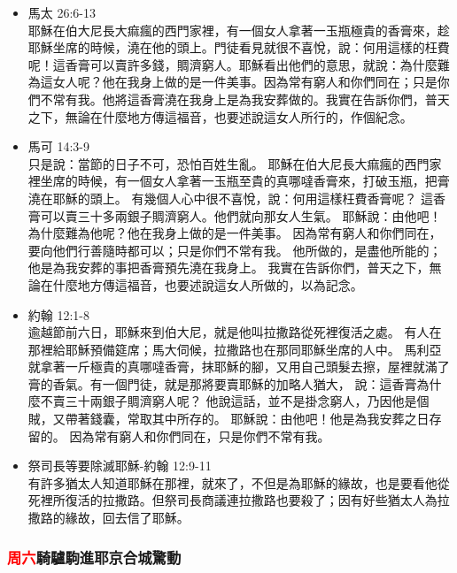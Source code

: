 \begin{itemize}
\item 馬太 26:6-13\\
耶穌在伯大尼長大痲瘋的西門家裡，有一個女人拿著一玉瓶極貴的香膏來，趁耶穌坐席的時候，澆在他的頭上。門徒看見就很不喜悅，說：何用這樣的枉費呢！這香膏可以賣許多錢，賙濟窮人。耶穌看出他們的意思，就說：為什麼難為這女人呢？他在我身上做的是一件美事。因為常有窮人和你們同在；只是你們不常有我。他將這香膏澆在我身上是為我安葬做的。我實在告訴你們，普天之下，無論在什麼地方傳這福音，也要述說這女人所行的，作個紀念。
\item 馬可 14:3-9\\
只是說：當節的日子不可，恐怕百姓生亂。
耶穌在伯大尼長大痲瘋的西門家裡坐席的時候，有一個女人拿著一玉瓶至貴的真哪噠香膏來，打破玉瓶，把膏澆在耶穌的頭上。
有幾個人心中很不喜悅，說：何用這樣枉費香膏呢？
這香膏可以賣三十多兩銀子賙濟窮人。他們就向那女人生氣。
耶穌說：由他吧！為什麼難為他呢？他在我身上做的是一件美事。
因為常有窮人和你們同在，要向他們行善隨時都可以；只是你們不常有我。
他所做的，是盡他所能的；他是為我安葬的事把香膏預先澆在我身上。
我實在告訴你們，普天之下，無論在什麼地方傳這福音，也要述說這女人所做的，以為記念。
\item 約翰 12:1-8\\
逾越節前六日，耶穌來到伯大尼，就是他叫拉撒路從死裡復活之處。
有人在那裡給耶穌預備筵席；馬大伺候，拉撒路也在那同耶穌坐席的人中。
馬利亞就拿著一斤極貴的真哪噠香膏，抹耶穌的腳，又用自己頭髮去擦，屋裡就滿了膏的香氣。有一個門徒，就是那將要賣耶穌的加略人猶大，
說：這香膏為什麼不賣三十兩銀子賙濟窮人呢？
他說這話，並不是掛念窮人，乃因他是個賊，又帶著錢囊，常取其中所存的。
耶穌說：由他吧！他是為我安葬之日存留的。
因為常有窮人和你們同在，只是你們不常有我。
\item 祭司長等要除滅耶穌-約翰 12:9-11\\
有許多猶太人知道耶穌在那裡，就來了，不但是為耶穌的緣故，也是要看他從死裡所復活的拉撒路。但祭司長商議連拉撒路也要殺了；因有好些猶太人為拉撒路的緣故，回去信了耶穌。
\end{itemize}

\subsubsection{\textcolor{red}{周六}騎驢駒進耶京合城驚動}

